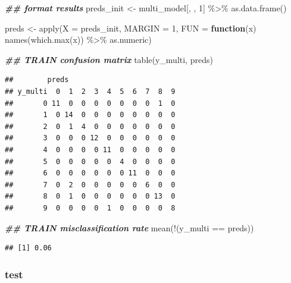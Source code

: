 \documentclass[
]{book}
\newenvironment{Shaded}{\begin{snugshade}}{\end{snugshade}}
\newcommand{\AttributeTok}[1]{\textcolor[rgb]{0.77,0.63,0.00}{#1}}
\newcommand{\ControlFlowTok}[1]{\textcolor[rgb]{0.13,0.29,0.53}{\textbf{#1}}}
\newcommand{\DecValTok}[1]{\textcolor[rgb]{0.00,0.00,0.81}{#1}}
\newcommand{\DocumentationTok}[1]{\textcolor[rgb]{0.56,0.35,0.01}{\textbf{\textit{#1}}}}
\newcommand{\FunctionTok}[1]{\textcolor[rgb]{0.00,0.00,0.00}{#1}}
\newcommand{\NormalTok}[1]{#1}
\newcommand{\OtherTok}[1]{\textcolor[rgb]{0.56,0.35,0.01}{#1}}
\newcommand{\SpecialCharTok}[1]{\textcolor[rgb]{0.00,0.00,0.00}{#1}}
\begin{document}
\begin{Shaded}
\begin{Highlighting}[]
\DocumentationTok{\#\# format results}
\NormalTok{preds\_init }\OtherTok{\textless{}{-}}\NormalTok{ multi\_model[, , }\DecValTok{1}\NormalTok{] }\SpecialCharTok{\%\textgreater{}\%}
  \FunctionTok{as.data.frame}\NormalTok{()}

\NormalTok{preds }\OtherTok{\textless{}{-}} \FunctionTok{apply}\NormalTok{(}\AttributeTok{X =}\NormalTok{ preds\_init,}
               \AttributeTok{MARGIN =} \DecValTok{1}\NormalTok{,}
               \AttributeTok{FUN =} \ControlFlowTok{function}\NormalTok{(x) }\FunctionTok{names}\NormalTok{(}\FunctionTok{which.max}\NormalTok{(x)) }\SpecialCharTok{\%\textgreater{}\%}\NormalTok{ as.numeric)}

\DocumentationTok{\#\# TRAIN confusion matrix}
\FunctionTok{table}\NormalTok{(y\_multi, preds)}
\end{Highlighting}
\end{Shaded}

\begin{verbatim}
##        preds
## y_multi  0  1  2  3  4  5  6  7  8  9
##       0 11  0  0  0  0  0  0  0  1  0
##       1  0 14  0  0  0  0  0  0  0  0
##       2  0  1  4  0  0  0  0  0  0  0
##       3  0  0  0 12  0  0  0  0  0  0
##       4  0  0  0  0 11  0  0  0  0  0
##       5  0  0  0  0  0  4  0  0  0  0
##       6  0  0  0  0  0  0 11  0  0  0
##       7  0  2  0  0  0  0  0  6  0  0
##       8  0  1  0  0  0  0  0  0 13  0
##       9  0  0  0  0  1  0  0  0  0  8
\end{verbatim}

\begin{Shaded}
\begin{Highlighting}[]
\DocumentationTok{\#\# TRAIN misclassification rate}
\FunctionTok{mean}\NormalTok{(}\SpecialCharTok{!}\NormalTok{(y\_multi }\SpecialCharTok{==}\NormalTok{ preds))}
\end{Highlighting}
\end{Shaded}

\begin{verbatim}
## [1] 0.06
\end{verbatim}

\hypertarget{test}{%
\subsubsection{test}\label{test}}
\end{document}
